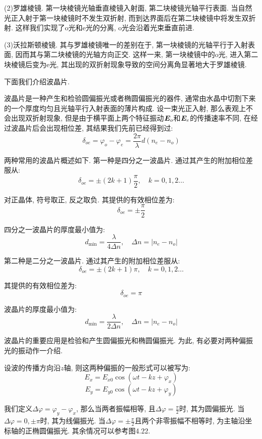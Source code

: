 (2)罗雄棱镜. 第一块棱镜光轴垂直棱镜入射面, 第二块棱镜光轴平行表面. 当自然光正入射于第一块棱镜时不发生双折射, 而到达界面后在第二块棱镜中将发生双折射. 这样我们实现了o光和e光的分离, o光会沿着光束垂直前进.

(3)沃拉斯顿棱镜. 其与罗雄棱镜唯一的差别在于, 第一块棱镜的光轴平行于入射表面, 因而其与第二块棱镜的光轴方向正交. 这样一来, 第一块棱镜中的o光, 进入第二块棱镜后变为e光, 其出现的双折射现象导致的空间分离角显著地大于罗雄棱镜.


下面我们介绍波晶片.

波晶片是一种产生和检验圆偏振光或者椭圆偏振光的器件, 通常由水晶中切割下来的一个厚度均匀且光轴平行入射表面的薄片构成. 设一束光正入射, 那么表观上不会出现双折射现象, 但是由于横平面上两个特征振动$\bm{E}_o$和$\bm{E}_e$的传播速率不同, 在经过波晶片后会出现相位差, 其结果我们先前已经得到过:
\[
\delta_{oe} = \varphi_o-\varphi_e =\frac{2\pi}{\lambda}d(n_e-n_o)
\]


两种常用的波晶片概述如下. 第一种是四分之一波晶片. 通过其产生的附加相位差服从:
\[
\delta_{oe} = \pm(2k+1)\frac{\pi}{2}, \quad k = 0,1,2\dots
\]

对正晶体, 符号取正, 反之取负. 其提供的有效相位差为:
\[
\delta_{oe} = \pm\frac{\pi}{2}
\]

四分之一波晶片的厚度最小值为:
\[
d_{\min} = \frac{\lambda}{4\Delta n}, \quad \Delta n = |n_e-n_o|
\]

第二种是二分之一波晶片. 通过其产生的附加相位差服从:
\[
\delta_{oe} = \pm(2k+1)\pi, \quad k = 0,1,2\dots
\]

其提供的有效相位差为:
\[
\delta_{oe} = \pi
\]

波晶片的厚度最小值为:
\[
d_{\min} = \frac{\lambda}{2\Delta n}, \quad \Delta n = |n_e-n_o|
\]

波晶片的重要应用是检验和产生圆偏振光和椭圆偏振光. 为此, 有必要对两种偏振光的振动作一介绍.

设波的传播方向沿$z$轴, 则这两种偏振的一般形式可以被写为:
\[
E_x = E_{x0} \cos(\omega t-kz+\varphi_x)
\]
\[
E_y = E_{y0} \cos(\omega t-kz+\varphi_y)
\]

我们定义$\Delta \varphi = \varphi_y-\varphi_x$, 那么当两者振幅相等, 且$\Delta \varphi = \frac{\pi}{2}$时, 其为圆偏振光. 当$\Delta \varphi = 0,\pm \pi$时, 其为线偏振光. 当$\Delta\varphi=\pm\frac{\pi}{2}$且两个非零振幅不相等时, 为主轴沿坐标轴的正椭圆偏振光. 其余情况可以参考图4.22.


